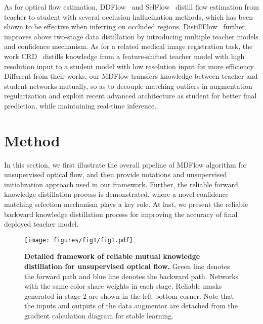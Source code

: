 \documentclass[lettersize,journal]{IEEEtran}
\begin{document}
As for optical flow estimation, DDFlow~\cite{Liu:2019:DDFlow} and SelFlow~\cite{Liu:2019:SelFlow} distill flow estimation from teacher to student with several occlusion hallucination methods, which has been shown to be effective when inferring on occluded regions. DistillFlow~\cite{9444870} further improves above two-stage data distillation by introducing multiple teacher models and confidence mechanism. As for a related medical image registration task, the work CRD~\cite{9782430} distills knowledge from a feature-shifted teacher model with high resolution input to a student model with low resolution input for more efficiency. Different from their works, our MDFlow transfers knowledge between teacher and student networks mutually, so as to decouple matching outliers in augmentation regularization and exploit recent advanced architecture as student for better final prediction, while maintaining real-time inference.


\section{Method}
In this section, we first illustrate the overall pipeline of MDFlow algorithm for unsupervised optical flow, and then provide notations and unsupervised initialization approach used in our framework. Further, the reliable forward knowledge distillation process is demonstrated, where a novel confidence matching selection mechanism plays a key role. At last, we present the reliable backward knowledge distillation process for improving the accuracy of final deployed teacher model.

\begin{figure*}[t]
	\centering
	\texttt{[image: figures/fig1/fig1.pdf]}
	\caption{\textbf{Detailed framework of reliable mutual knowledge distillation for unsupervised optical flow.} \textcolor{mygreen}{Green line} denotes the forward path and \textcolor{myblue}{blue line} denotes the backward path. Networks with the same color share weights in each stage. Reliable masks  generated in stage 2 are shown in the left bottom corner. Note that the inputs and outputs of the data augmentor  are detached from the gradient calculation diagram for stable learning.}
	\label{fig:1}
\end{figure*}
\end{document}
